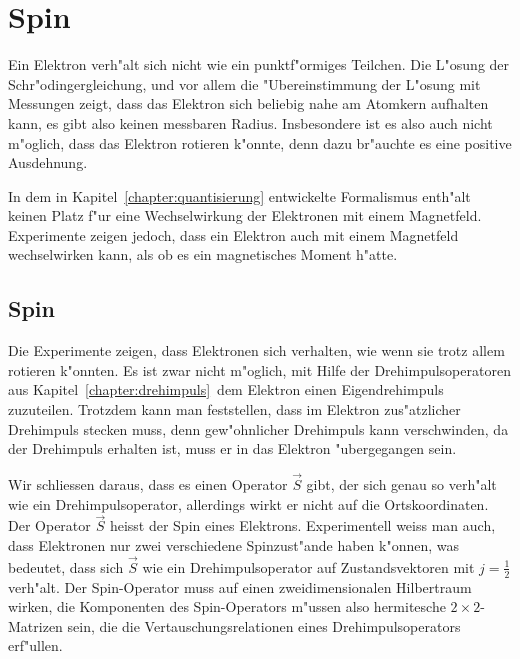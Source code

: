 \chapter{Spin\label{chapter:spin}}
\rhead{}
Ein Elektron verh"alt sich nicht wie ein punktf"ormiges Teilchen.
Die L"osung der Schr"odingergleichung, und vor allem die "Ubereinstimmung
der L"osung mit Messungen zeigt, dass das Elektron sich beliebig nahe 
am Atomkern aufhalten kann, es gibt also keinen messbaren Radius.
Insbesondere ist es also auch nicht m"oglich, dass das Elektron
rotieren k"onnte, denn dazu br"auchte es eine positive Ausdehnung.

In dem in Kapitel~\ref{chapter:quantisierung} entwickelte Formalismus
enth"alt keinen Platz f"ur eine Wechselwirkung der Elektronen
mit einem Magnetfeld.
Experimente zeigen jedoch, dass ein Elektron auch mit einem Magnetfeld
wechselwirken kann, als ob es ein magnetisches Moment h"atte. 

\section{Spin}
Die Experimente zeigen, dass Elektronen sich verhalten, wie wenn sie
trotz allem rotieren k"onnten.
Es ist zwar nicht m"oglich, mit Hilfe der Drehimpulsoperatoren
aus Kapitel~\ref{chapter:drehimpuls} dem Elektron einen Eigendrehimpuls
zuzuteilen.
Trotzdem kann man feststellen, dass im Elektron zus"atzlicher
Drehimpuls stecken muss, denn gew"ohnlicher Drehimpuls kann verschwinden,
da der Drehimpuls erhalten ist, muss er in das Elektron "ubergegangen
sein.

Wir schliessen daraus, dass es einen Operator $\vec S$ gibt, der sich
genau so verh"alt wie ein Drehimpulsoperator, allerdings wirkt er nicht
auf die Ortskoordinaten.
Der Operator $\vec S$ heisst der Spin eines Elektrons.
Experimentell weiss man auch, dass Elektronen nur zwei verschiedene
Spinzust"ande haben k"onnen, was bedeutet, dass sich $\vec S$ wie ein
Drehimpulsoperator auf Zustandsvektoren mit $j=\frac12$ verh"alt.
Der Spin-Operator muss auf einen zweidimensionalen Hilbertraum
wirken, die Komponenten des Spin-Operators m"ussen also hermitesche
$2\times 2$-Matrizen sein, die die Vertauschungsrelationen eines
Drehimpulsoperators erf"ullen.


